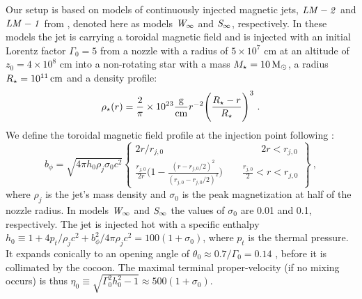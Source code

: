 \documentclass[fleqn,usenatbib]{mnras}
\newcommand{\msun}{\,{\rm M_{\odot}}}
\newcommand{\cm}{\,{\rm cm}}
\newcommand{\Wc}{{\it W_{\infty}}}
\newcommand{\Sc}{{\it S_{\infty}}}
\begin{document}
	Our setup is based on models of continuously injected magnetic jets, $ {\it LM-2} $ and $ {\it LM-1} $ from \citet{Gottlieb2020b}, denoted here as models $ \Wc $ and $ \Sc $, respectively.
	In these models the jet is carrying a toroidal magnetic field and is injected with an initial Lorentz factor $ \Gamma_0 = 5 $ from a nozzle with a radius of $ 5\times 10^7 $ cm at an altitude of $ z_0 = 4 \times 10^8 $ cm into a non-rotating star with a mass $ M_\star = 10\msun $, a radius $ R_\star = 10^{11}\cm $ and a density profile:
	\begin{equation}\label{eq:star}
	\rho_\star(r) = \frac{2}{\pi}\times 10^{23}{\rm \frac{g}{cm}} r^{-2}\Bigg(\frac{R_\star-r}{R_\star}\Bigg)^3~.
	\end{equation}
	We define the toroidal magnetic field profile at the injection point following \citet{Mignone2009,Mignone2013,Gottlieb2020b}:
	\begin{equation}
	b_\phi = \sqrt{4\pi h_0\rho_j\sigma_0c^2}{\left\{\begin{array}{c} 2r/r_{j,0} \qquad\qquad\qquad\qquad\qquad 2r<r_{j,0} \\ \frac{r_{j,0}}{2r}\Big(1-\frac{(r-r_{j,0}/2)^2}{(r_{j,0}-r_{j,0}/2)^2}\Big) \qquad \frac{r_{j,0}}{2}<r<r_{j,0} \end{array}\right\}}~,
	\end{equation}
	where $ \rho_j $ is the jet's mass density and $\sigma_0$ is the peak magnetization at half of the nozzle radius.
	In models $ \Wc $ and $ \Sc $ the values of $ \sigma_0 $ are 0.01 and 0.1, respectively.
	The jet is injected hot with a specific enthalpy $ h_0 \equiv 1+4p_t/\rho_j c^2+b_\phi^2/4\pi\rho_j c^2 = 100(1+\sigma_0) $, where $ p_t $ is the thermal pressure. It expands conically to an opening angle of $ \theta_0 \approx 0.7/\Gamma_0 = 0.14 $ \citep{Mizuta2013,Harrison2018}, before it is collimated by the cocoon. The maximal terminal proper-velocity (if no mixing occurs) is thus $ \eta_0 \equiv \sqrt{\Gamma_0^2h_0^2-1} \approx 500(1+\sigma_0) $.
	
\end{document}

